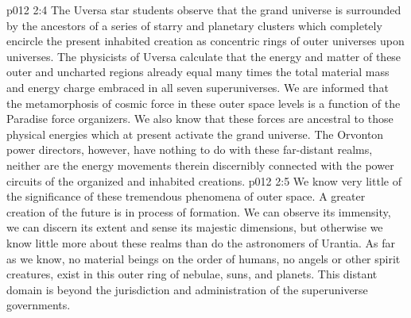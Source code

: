 \vs p012 2:4 \pc The Uversa star students observe that the grand universe is surrounded by the ancestors of a series of starry and planetary clusters which completely encircle the present inhabited creation as concentric rings of outer universes upon universes. The physicists of Uversa calculate that the energy and matter of these outer and uncharted regions already equal many times the total material mass and energy charge embraced in all seven superuniverses. We are informed that the metamorphosis of cosmic force in these outer space levels is a function of the Paradise force organizers. We also know that these forces are ancestral to those physical energies which at present activate the grand universe. The Orvonton power directors, however, have nothing to do with these far\hyp{}distant realms, neither are the energy movements therein discernibly connected with the power circuits of the organized and inhabited creations.
\vs p012 2:5 \pc We know very little of the significance of these tremendous phenomena of outer space. A greater creation of the future is in process of formation. We can observe its immensity, we can discern its extent and sense its majestic dimensions, but otherwise we know little more about these realms than do the astronomers of Urantia. As far as we know, no material beings on the order of humans, no angels or other spirit creatures, exist in this outer ring of nebulae, suns, and planets. This distant domain is beyond the jurisdiction and administration of the superuniverse governments.
